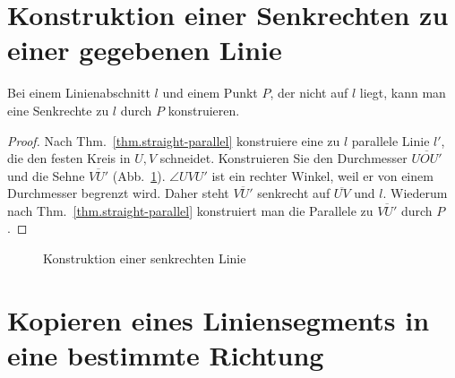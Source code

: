 \section{Konstruktion einer Senkrechten zu einer gegebenen Linie}\label{s.perp}

\begin{theorem}\label{thm.straight-perp}
Bei einem Linienabschnitt $l$ und einem Punkt $P$, der nicht auf $l$ liegt, kann man eine Senkrechte zu $l$ durch $P$ konstruieren.
\end{theorem}

\begin{proof}
Nach Thm.~\ref{thm.straight-parallel} konstruiere eine zu $l$ parallele Linie $l'$, die den festen Kreis in $U,V$ schneidet. Konstruieren Sie den Durchmesser $\overline{UOU'}$ und die Sehne $\overline{VU'}$ (Abb.~\ref{f.se-perp}). $\angle UVU'$ ist ein rechter Winkel, weil er von einem Durchmesser begrenzt wird. Daher steht $\overline{VU'}$ senkrecht auf $\overline{UV}$ und $l$. Wiederum nach Thm.~\ref{thm.straight-parallel} konstruiert man die Parallele zu $\overline{VU'}$ durch $P$.
\end{proof}

\begin{figure}[htb]
\begin{center}
\end{center}
\caption{Konstruktion einer senkrechten Linie}\label{f.se-perp}
\end{figure}

\section{Kopieren eines Liniensegments in eine bestimmte Richtung}\label{s.copy}

